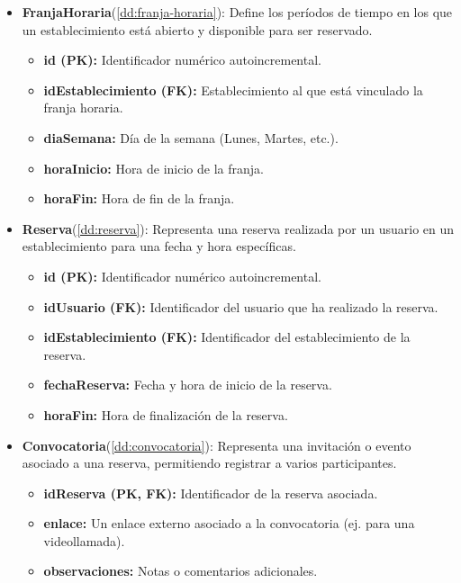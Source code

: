 \newpage

\begin{itemize}
	\item \textbf{FranjaHoraria}(\ref{dd:franja-horaria}): Define los períodos de tiempo en los que un establecimiento está abierto y disponible para ser reservado.
	\begin{itemize}
       \item \textbf{id (PK):} Identificador numérico autoincremental.
       \item \textbf{idEstablecimiento (FK):} Establecimiento al que está vinculado la franja horaria.
       \item \textbf{diaSemana:} Día de la semana (Lunes, Martes, etc.).
       \item \textbf{horaInicio:} Hora de inicio de la franja.
       \item \textbf{horaFin:} Hora de fin de la franja.
	\end{itemize}
\end{itemize}

\begin{itemize}
	\item \textbf{Reserva}(\ref{dd:reserva}): Representa una reserva realizada por un usuario en un establecimiento para una fecha y hora específicas.
	\begin{itemize}
       \item \textbf{id (PK):} Identificador numérico autoincremental.
       \item \textbf{idUsuario (FK):} Identificador del usuario que ha realizado la reserva.
       \item \textbf{idEstablecimiento (FK):} Identificador del establecimiento de la reserva.
       \item \textbf{fechaReserva:} Fecha y hora de inicio de la reserva.
       \item \textbf{horaFin:} Hora de finalización de la reserva.
	\end{itemize}
\end{itemize}

\begin{itemize}
	\item \textbf{Convocatoria}(\ref{dd:convocatoria}): Representa una invitación o evento asociado a una reserva, permitiendo registrar a varios participantes.
	\begin{itemize}
       \item \textbf{idReserva (PK, FK):} Identificador de la reserva asociada.
       \item \textbf{enlace:} Un enlace externo asociado a la convocatoria (ej. para una videollamada).
       \item \textbf{observaciones:} Notas o comentarios adicionales.
	\end{itemize}
\end{itemize}

